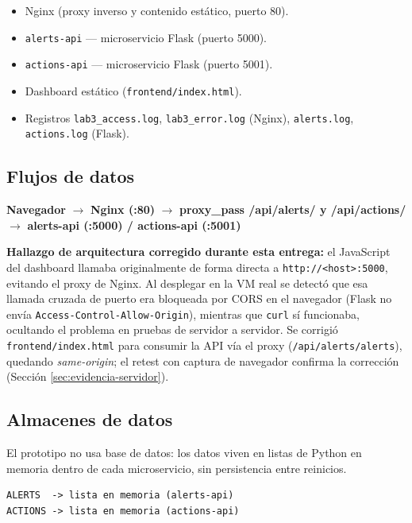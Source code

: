 \documentclass[journal]{IEEEtran}
\begin{document}
\begin{itemize}
    \item Nginx (proxy inverso y contenido estático, puerto 80).
    \item \texttt{alerts-api} --- microservicio Flask (puerto 5000).
    \item \texttt{actions-api} --- microservicio Flask (puerto 5001).
    \item Dashboard estático (\texttt{frontend/index.html}).
    \item Registros \texttt{lab3\_access.log}, \texttt{lab3\_error.log}
    (Nginx), \texttt{alerts.log}, \texttt{actions.log} (Flask).
\end{itemize}

\subsection{Flujos de datos}

\begin{center}
\textbf{Navegador}
$\rightarrow$
\textbf{Nginx (:80)}
$\rightarrow$
\textbf{proxy\_pass /api/alerts/ y /api/actions/}
$\rightarrow$
\textbf{alerts-api (:5000) / actions-api (:5001)}
\end{center}

\textbf{Hallazgo de arquitectura corregido durante esta entrega:} el
JavaScript del dashboard llamaba originalmente de forma directa a
\texttt{http://<host>:5000}, evitando el proxy de Nginx. Al desplegar en la VM
real se detectó que esa llamada cruzada de puerto era bloqueada por CORS en el
navegador (Flask no envía \texttt{Access-Control-Allow-Origin}), mientras que
\texttt{curl} sí funcionaba, ocultando el problema en pruebas de servidor a
servidor. Se corrigió \texttt{frontend/index.html} para consumir la API vía
el proxy (\texttt{/api/alerts/alerts}), quedando \textit{same-origin}; el
retest con captura de navegador confirma la corrección (Sección
\ref{sec:evidencia-servidor}).

\subsection{Almacenes de datos}

El prototipo no usa base de datos: los datos viven en listas de Python en
memoria dentro de cada microservicio, sin persistencia entre reinicios.

\begin{lstlisting}
ALERTS  -> lista en memoria (alerts-api)
ACTIONS -> lista en memoria (actions-api)
\end{lstlisting}
\end{document}
